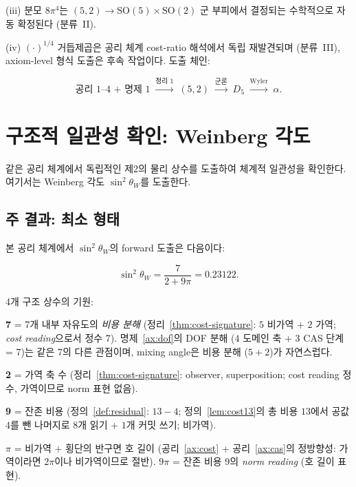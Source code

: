 \documentclass[entropy,article,submit,pdftex,oneauthor]{Definitions/mdpi}
\begin{document}
(iii) 분모 $8\pi^4$는 $(5,2) \to \mathrm{SO}(5)\times\mathrm{SO}(2)$ 군 부피에서 결정되는 수학적으로 자동 확정된다 (분류~II).

(iv) $(\cdot)^{1/4}$ 거듭제곱은 공리 체계 cost-ratio 해석에서 독립 재발견되며 (분류~III), axiom-level 형식 도출은 후속 작업이다. 도출 체인:
\begin{linenomath}
\begin{equation}
\text{공리~1--4 + 명제~1} \;\xrightarrow{\text{정리~1}}\; (5,2) \;\xrightarrow{\text{군론}}\; D_5 \;\xrightarrow{\text{Wyler}}\; \alpha.
\end{equation}
\end{linenomath}

\section{구조적 일관성 확인: Weinberg 각도}
\label{sec:prediction}

같은 공리 체계에서 독립적인 제2의 물리 상수를 도출하여 체계적 일관성을 확인한다. 여기서는 Weinberg 각도 $\sin^2\theta_W$를 도출한다.

\subsection{주 결과: 최소 형태}

본 공리 체계에서 $\sin^2\theta_W$의 forward 도출은 다음이다:
\begin{linenomath}
\begin{equation}
\boxed{\sin^2\theta_W = \frac{7}{2 + 9\pi} = 0.23122.}
\label{eq:weinberg-main}
\end{equation}
\end{linenomath}

4개 구조 상수의 기원:

\textbf{7} = 7개 내부 자유도의 \emph{비용 분해} (정리~\ref{thm:cost-signature}: $5$ 비가역 + $2$ 가역; \emph{cost reading}으로서 정수 7). 명제~\ref{ax:dof}의 DOF 분해 ($4$ 도메인 축 + $3$ CAS 단계 = 7)는 같은 7의 다른 관점이며, mixing angle은 비용 분해 ($5+2$)가 자연스럽다.

\textbf{2} = 가역 축 수 (정리~\ref{thm:cost-signature}: observer, superposition; cost reading 정수, 가역이므로 norm 표현 없음).

\textbf{9} = 잔존 비용 (정의~\ref{def:residual}: $13 - 4$; 정의~\ref{lem:cost13}의 총 비용 $13$에서 공값 $4$를 뺀 나머지로 $8$개 읽기 + $1$개 커밋 쓰기; 비가역).

\textbf{$\pi$} = 비가역 $+$ 횡단의 반구면 호 길이 (공리~\ref{ax:cost} + 공리~\ref{ax:cas}의 정방향성: 가역이라면 $2\pi$이나 비가역이므로 절반). $9\pi$ = 잔존 비용 9의 \emph{norm reading} (호 길이 표현).
\end{document}
